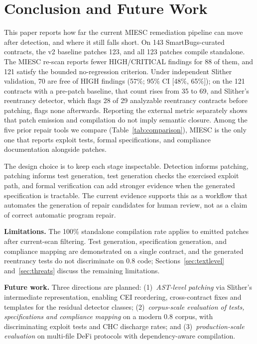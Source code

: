\documentclass[conference]{IEEEtran}
\begin{document}
\section{Conclusion and Future Work}

This paper reports how far the current MIESC remediation pipeline can move after detection, and where it still falls short. On 143 SmartBugs-curated contracts, the v2 baseline patches 123, and all 123 patches compile standalone. The MIESC re-scan reports fewer HIGH/CRITICAL findings for 88 of them, and 121 satisfy the bounded no-regression criterion. Under independent Slither validation, 70 are free of HIGH findings (57\%; 95\% CI [48\%, 65\%]); on the 121 contracts with a pre-patch baseline, that count rises from 35 to 69, and Slither's reentrancy detector, which flags 28 of 29 analyzable reentrancy contracts before patching, flags none afterwards. Reporting the external metric separately shows that patch emission and compilation do not imply semantic closure. Among the five prior repair tools we compare (Table~\ref{tab:comparison}), MIESC is the only one that reports exploit tests, formal specifications, and compliance documentation alongside patches.

The design choice is to keep each stage inspectable. Detection informs patching, patching informs test generation, test generation checks the exercised exploit path, and formal verification can add stronger evidence when the generated specification is tractable. The current evidence supports this as a workflow that automates the generation of repair candidates for human review, not as a claim of correct automatic program repair.

\textbf{Limitations.} The 100\% standalone compilation rate applies to emitted patches after current-scan filtering. Test generation, specification generation, and compliance mapping are demonstrated on a single contract, and the generated reentrancy tests do not discriminate on 0.8 code; Sections~\ref{sec:textlevel} and~\ref{sec:threats} discuss the remaining limitations.

\textbf{Future work.} Three directions are planned: (1)~\emph{AST-level patching} via Slither's intermediate representation, enabling CEI reordering, cross-contract fixes and templates for the residual detector classes; (2)~\emph{corpus-scale evaluation of tests, specifications and compliance mapping} on a modern 0.8 corpus, with discriminating exploit tests and CHC discharge rates; and (3)~\emph{production-scale evaluation} on multi-file DeFi protocols with dependency-aware compilation.
\end{document}
